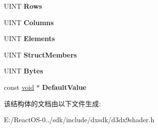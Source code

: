 \begin{DoxyCompactItemize}
U\+I\+NT {\bfseries Rows}
\item 
\mbox{\label{struct___d3_d_x_c_o_n_s_t_a_n_t___d_e_s_c_a16c7d450360ea0b8a0a763e877ba7b07}} 
U\+I\+NT {\bfseries Columns}
\item 
\mbox{\label{struct___d3_d_x_c_o_n_s_t_a_n_t___d_e_s_c_abc50f9774055687e646cfbe36a8e4b69}} 
U\+I\+NT {\bfseries Elements}
\item 
\mbox{\label{struct___d3_d_x_c_o_n_s_t_a_n_t___d_e_s_c_a80c64fb43ce3dc31f35840eec243f932}} 
U\+I\+NT {\bfseries Struct\+Members}
\item 
\mbox{\label{struct___d3_d_x_c_o_n_s_t_a_n_t___d_e_s_c_a80c583f6a9018b13ba70ae7326191b8e}} 
U\+I\+NT {\bfseries Bytes}
\item 
\mbox{\label{struct___d3_d_x_c_o_n_s_t_a_n_t___d_e_s_c_a1205ed6756e1844a978211cdea412579}} 
const \hyperlink{interfacevoid}{void} $\ast$ {\bfseries Default\+Value}
\end{DoxyCompactItemize}


该结构体的文档由以下文件生成\+:\begin{DoxyCompactItemize}
\item 
E\+:/\+React\+O\+S-\/0../sdk/include/dxsdk/d3dx9shader.\+h\end{DoxyCompactItemize}
